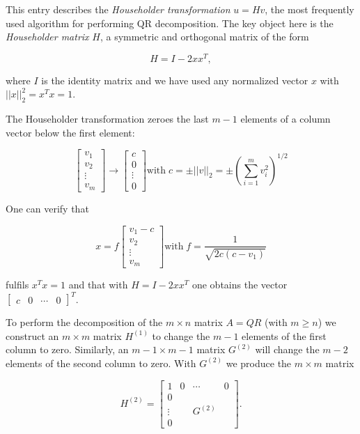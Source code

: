 \documentclass{article}
\begin{document}
This entry describes the \emph{Householder transformation} $u=Hv$, the most frequently used algorithm for performing QR decomposition.  The key object here is the \emph{Householder matrix} $H$, a symmetric and orthogonal matrix of the form

$$ H = I - 2xx^T, $$

where $I$ is the identity matrix and we have used any normalized vector $x$ with $||x||_2^2 = x^Tx = 1$.

The Householder transformation zeroes the last $m-1$ elements of a column vector below the first element:

$$ \begin{bmatrix}v_1 \\ v_2 \\ \vdots \\ v_m \end{bmatrix} \rightarrow \begin{bmatrix}c \\ 0 \\ \vdots \\ 0 \end{bmatrix} \text{with}\; c = \pm ||v||_2 = \pm \left(\sum_{i=1}^m v_i^2\right)^{1/2} $$

One can verify that

$$ x = f \begin{bmatrix}v_1 - c \\ v_2 \\ \vdots \\ v_m \end{bmatrix} \text{with}\; f=\frac{1}{\sqrt{2c(c-v_1)}} $$

fulfils $x^Tx=1$ and that with $H=I-2xx^T$ one obtains the vector $\begin{bmatrix}c & 0 & \cdots & 0 \end{bmatrix}^T$.

To perform the decomposition of the $m \times n$ matrix $A = QR$ (with $m \ge n$) we construct an $m \times m$ matrix $H^{(1)}$ to change the $m-1$ elements of the first column to zero.  Similarly, an $m-1 \times m-1$ matrix $G^{(2)}$ will change the $m-2$ elements of the second column to zero. With $G^{(2)}$ we produce the $m \times m$ matrix

$$ H^{(2)} = \begin{bmatrix}1 & 0 & \cdots & 0 \\ 0 & \; & \; & \; \\ \vdots & \; & G^{(2)} & \; \\ 0 & \; & \; & \; \end{bmatrix}.$$
\end{document}
